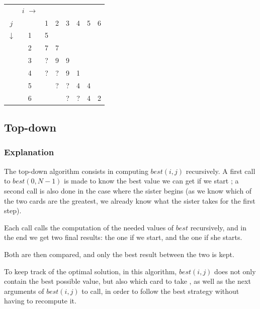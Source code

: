 \documentclass[11pt]{article}
\begin{document}
	\begin{tabular}[c]{cc|cccccc}
		& $i$ $\rightarrow$\\

		$j$          &   & 1 & 2 & 3 & 4 & 5 & 6 \\
		             \cline{2-8}
					 $\downarrow$ & 1 & 5 & \cellcolor{black!10} & \cellcolor{black!10} & \cellcolor{black!10} & \cellcolor{black!10} & \cellcolor{black!10} \\
		             & 2 & 7 & 7 & \cellcolor{black!10} & \cellcolor{black!10} & \cellcolor{black!10} & \cellcolor{black!10} \\
		             & 3 & ? & 9 & 9 & \cellcolor{black!10} & \cellcolor{black!10} & \cellcolor{black!10} \\
		             & 4 & ? & ? & 9 & 1 & \cellcolor{black!10} & \cellcolor{black!10} \\
					 & 5 & \color{myred}{\textbf{?}} & ? & ? & 4 & 4 & \cellcolor{black!10} \\
					 & 6 & \color{myred}{\textbf{?}} & \color{myred}{\textbf{?}} & ? & ? & 4 & 2
		
	\end{tabular}
	\hspace{2cm}
	\begin{minipage}{5cm}
	\end{minipage}

\subsection{Top-down}
\subsubsection{Explanation}
The top-down algorithm consists in computing $best(i, j)$ recursively.
A first call to $best(0, N-1)$ is made to know the best value we can get
if we start ; a second call is also done in the case where the sister begins
(as we know which of the two cards are the greatest, we already know what the
sister takes for the first step).

Each call calls the computation of the needed values of $best$ recursively, and
in the end we get two final results: the one if we start,
and the one if she starts.

Both are then compared, and only the best result between the two is kept.

To keep track of the optimal solution, in this algorithm, $best(i, j)$ does not
only contain the best possible value, but also which card to take
, as well as the next arguments of $best(i, j)$ to call, 
in order to follow the best strategy without having to recompute it.
\end{document}
